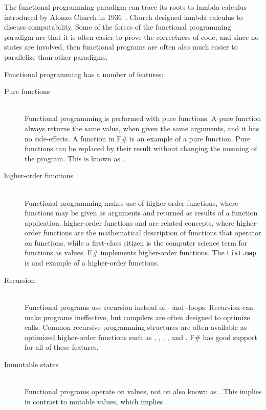 \documentclass[fsharpNotes.tex]{subfiles}
\begin{document}
The functional programming paradigm can trace its roots to lambda calculus introduced by Alonzo Church in 1936~\cite{church36}. Church designed lambda calculus to discuss computability. Some of the forces of the functional programming paradigm are that it is often easier to prove the correctness of code, and since no states are involved, then functional programs are often also much easier to parallelize than other paradigms.

Functional programming has a number of features:
\begin{description}
\item[Pure functions]~\\
Functional programming is performed with pure functions. A pure function always returns the same value, when given the same arguments, and it has no side-effects. A function in F\# is an example of a pure function. Pure functions can be replaced by their result without changing the meaning of the program. This is known as .
\item[higher-order functions]~\\
Functional programming makes use of higher-order functions, where functions may be given as arguments and returned as results of a function application. higher-order functions and  are related concepts, where higher-order functions are the mathematical description of functions that operator on functions, while a first-class citizen is the computer science term for functions as values. F\# implements higher-order functions. The \lstinline{List.map} is and example of a higher-order functions.
\item[Recursion]~\\
Functional programs use recursion instead of - and -loops. Recursion can make programs ineffective, but compilers are often designed to optimize  calls. Common recursive programming structures are often available as optimized higher-order functions such as , , , , and . F\# has good support for all of these features.
\item[Immutable states]~\\
Functional programs operate on values, not on  also known as . This implies  in contrast to mutable values, which implies .

\end{description}
\end{document}
